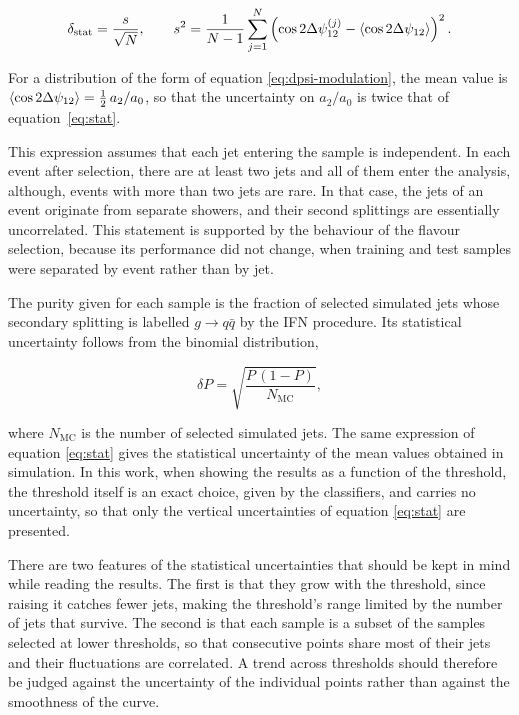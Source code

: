 \begin{equation}
  \delta_{\text{stat}} = \frac{s}{\sqrt{N}},
  \qquad
  s^2 = \frac{1}{N-1}\sum_{j=1}^{N}
        \left( \cos 2\Delta\psi_{12}^{(j)} - \langle \cos 2\Delta\psi_{12} \rangle \right)^2 .
  \label{eq:stat}
\end{equation}

For a distribution of the form of equation \eqref{eq:dpsi-modulation}, the mean value
is $\langle \cos 2\Delta\psi_{12} \rangle = \tfrac{1}{2}\,a_2/a_0$, so that the uncertainty on
$a_2/a_0$ is twice that of equation~\eqref{eq:stat}.

This expression assumes that each jet entering the sample is independent. In each event after selection,
there are at least two jets and all of them enter the analysis, although, events with 
more than two jets are rare. In that case, the jets of an event originate from separate showers, and their second splittings
are essentially uncorrelated. This statement is supported by the behaviour of the flavour
selection, because its performance did not change, when training and test samples were
separated by event rather than by jet.

The purity given for each sample is the fraction of selected simulated jets whose secondary
splitting is labelled $g \to q\bar{q}$ by the IFN procedure. Its
statistical uncertainty follows from the binomial distribution,

\begin{equation}
  \delta P = \sqrt{\frac{P\,(1-P)}{N_{\text{MC}}}},
  \label{eq:purity-stat}
\end{equation}

where $N_{\text{MC}}$ is the number of selected simulated jets. The same
expression of equation \eqref{eq:stat} gives the statistical uncertainty of the mean
values obtained in simulation. In this work, when showing the results as a function
of the threshold, the threshold itself is an exact choice, given by the classifiers,
and carries no uncertainty, so that only the vertical uncertainties of equation \eqref{eq:stat} are presented.

There are two features of the statistical uncertainties that should be kept in mind while
reading the results. The first is that they grow with the threshold, since raising it
catches fewer jets, making the threshold's range limited by the number of jets that 
survive. The second is that each sample is a subset of the
samples selected at lower thresholds, so that consecutive points share most of
their jets and their fluctuations are correlated. A trend across thresholds should
therefore be judged against the uncertainty of the individual points rather than
against the smoothness of the curve.


